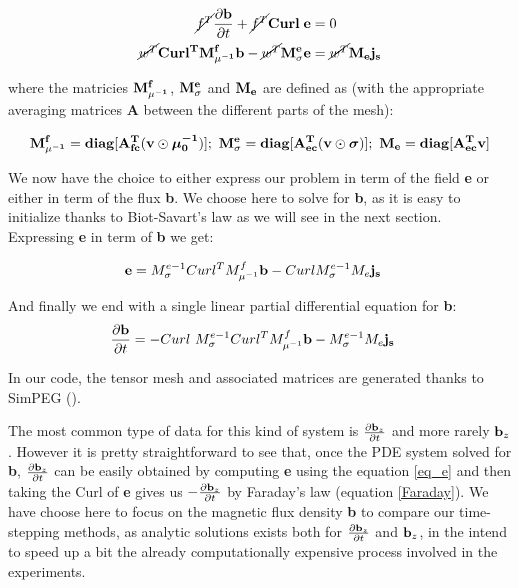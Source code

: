 \documentclass[twoside]{article}
\begin{document}
\begin{align}
\hbox{\cancel{$f^T$}}\frac{\bf{\partial b}}{\partial t} + \hbox{\cancel{$f^T$}}{\bf Curl \; e} &= 0\\
\hbox{\cancel{$w^T$}} {\bf Curl^T M_{\mu^{-1}}^f b - \hbox{\cancel{$w^T$}} M_{\sigma}^e e} &= \hbox{\cancel{$w^T$}} {\bf M_e j_s}
\end{align}

where the matricies ${\bf M_{\mu^{-1}}^f}$, ${\bf  M_{\sigma}^e}$ and ${\bf M_e}$ are defined as (with the appropriate averaging matrices \textbf{A} between the different parts of the mesh):

\begin{align}
{\bf M_{\mu^{-1}}^f = diag[A_{fc}^T (v \odot \boldsymbol{\mu_0^{-1}})]};~
{\bf M_{\sigma}^e}= {\bf diag[A_{ec}^T (v \odot \boldsymbol{\sigma})]};~
{\bf M_e = diag[A_{ec}^T v]}
\end{align}

We now have the choice to either express our problem in term of the field \textbf{e} or either in term of the flux \textbf{b}. We choose here to solve for \textbf{b}, as it is easy to initialize thanks to Biot-Savart's law as we will see in the next section. Expressing \textbf{e} in term of \textbf{b} we get:

\begin{align} \label{eq_e}
{\bf e} & = M_{\sigma}^{e-1} Curl^TM_{\mu^{-1}}^f {\bf b} - CurlM_{\sigma}^{e-1} M_e {\bf j_s}
\end{align}

And finally we end with a single linear partial differential equation for \textbf{b}:
\begin{align}
\frac{ \partial {\bf b}}{\partial t} & = -Curl~ M_{\sigma}^{e-1} Curl^T M_{\mu^{-1}}^f {\bf b} - M_{\sigma}^{e-1} M_e {\bf j_s}
\end{align}

In our code, the tensor mesh and associated matrices are generated thanks to SimPEG (\cite{CKH+:2015}).

The most common type of data for this kind of system is $\frac{\partial {\bf b}_z}{\partial t}$ and more rarely ${\bf b}_z$. However it is pretty straightforward to see that, once the PDE system solved for \textbf{b}, $\frac{\partial {\bf b}_z}{\partial t}$ can be easily obtained by computing \textbf{e} using the equation \ref{eq_e} and then taking the Curl of \textbf{e} gives us $-\frac{\partial {\bf b}_z}{\partial t}$ by Faraday's law (equation \ref{Faraday}).
We have choose here to focus on the magnetic flux density \textbf{b} to compare our time-stepping methods, as analytic solutions exists both for $\frac{\partial {\bf b}_z}{\partial t}$ and  ${\bf b}_z$, in the intend to speed up a bit the already computationally expensive process involved in the experiments.
\end{document}
